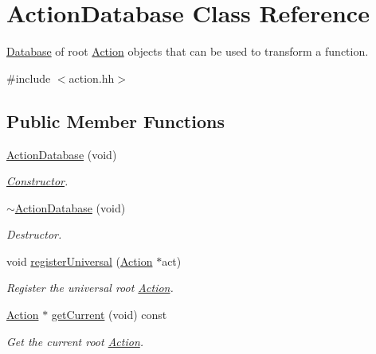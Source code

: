 \hypertarget{class_action_database}{}\section{Action\+Database Class Reference}
\label{class_action_database}


\mbox{\hyperlink{class_database}{Database}} of root \mbox{\hyperlink{class_action}{Action}} objects that can be used to transform a function.  




{\ttfamily \#include $<$action.\+hh$>$}

\subsection*{Public Member Functions}
\begin{DoxyCompactItemize}
\item 
\mbox{\hyperlink{class_action_database_a764e870dbcefd5f771695caba317e8e1}{Action\+Database}} (void)
\begin{DoxyCompactList}\small\item\em \mbox{\hyperlink{class_constructor}{Constructor}}. \end{DoxyCompactList}\item 
\mbox{\hyperlink{class_action_database_ad00598cb3da2f8bb682a4bdfabf7e6c0}{$\sim$\+Action\+Database}} (void)
\begin{DoxyCompactList}\small\item\em Destructor. \end{DoxyCompactList}\item 
void \mbox{\hyperlink{class_action_database_a6793eb1aba4974cf863c3818f57a1bdd}{register\+Universal}} (\mbox{\hyperlink{class_action}{Action}} $\ast$act)
\begin{DoxyCompactList}\small\item\em Register the {\itshape universal} root \mbox{\hyperlink{class_action}{Action}}. \end{DoxyCompactList}\item 
\mbox{\hyperlink{class_action}{Action}} $\ast$ \mbox{\hyperlink{class_action_database_af5fcde4af3947f6e02fd7fd4cf9e2ecc}{get\+Current}} (void) const
\begin{DoxyCompactList}\small\item\em Get the current {\itshape root} \mbox{\hyperlink{class_action}{Action}}. \end{DoxyCompactList}\item 

\end{DoxyCompactItemize}
